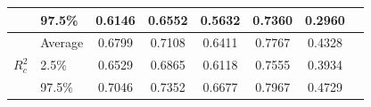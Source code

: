 \begin{table}[!ht]
\begin{tabular}{@{}llcccccc@{}}
                                           & 97.5\%  & 0.6146 & 0.6552 & 0.5632 & 0.7360 & 0.2960 \\ \midrule
      \multirow{3}{*}{$R^2_c$}            & Average & 0.6799 & 0.7108 & 0.6411 & 0.7767 & 0.4328 \\
                                           & 2.5\%   & 0.6529 & 0.6865 & 0.6118 & 0.7555 & 0.3934 \\
                                           & 97.5\%  & 0.7046 & 0.7352 & 0.6677 & 0.7967 & 0.4729 \\ \bottomrule
    \end{tabular}

\end{table}
